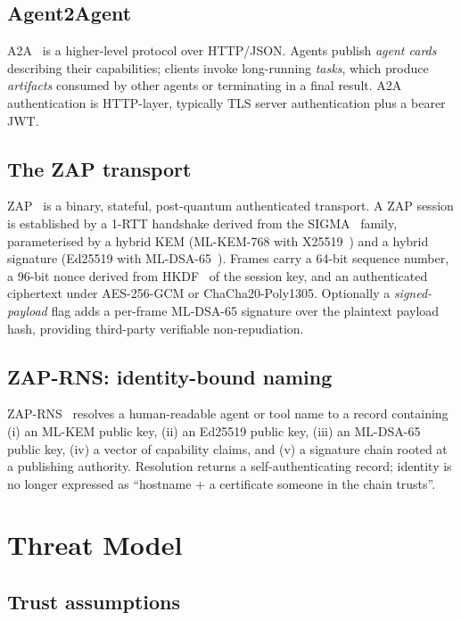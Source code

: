 \documentclass[11pt,a4paper]{article}
\theoremstyle{definition}
\theoremstyle{remark}
\newcommand{\zap}{\textsf{ZAP}\xspace}
\newcommand{\aatwo}{\textsf{A2A}\xspace}
\newcommand{\rns}{\textsf{ZAP-RNS}\xspace}
\begin{document}
\subsection{Agent2Agent}

\aatwo{}~\cite{a2a2025} is a higher-level protocol over HTTP/JSON.
Agents publish \emph{agent cards} describing their capabilities; clients
invoke long-running \emph{tasks}, which produce
\emph{artifacts} consumed by other agents or terminating in a final
result. \aatwo{} authentication is HTTP-layer, typically TLS server
authentication plus a bearer JWT.

\subsection{The \zap{} transport}

\zap{}~\cite{zaptransport} is a binary, stateful, post-quantum
authenticated transport. A \zap{} session is established by a 1-RTT
handshake derived from the SIGMA~\cite{sigma} family, parameterised by
a hybrid KEM (ML-KEM-768 with X25519~\cite{kyber2018,nistmlkem}) and a
hybrid signature (Ed25519 with ML-DSA-65~\cite{nistmldsa,ed25519}).
Frames carry a 64-bit sequence number, a 96-bit nonce derived from
HKDF~\cite{krawczyk2010hkdf} of the session key, and an authenticated
ciphertext under AES-256-GCM or ChaCha20-Poly1305. Optionally a
\emph{signed-payload} flag adds a per-frame ML-DSA-65 signature over
the plaintext payload hash, providing third-party verifiable
non-repudiation.

\subsection{\rns{}: identity-bound naming}

\rns{}~\cite{zaprns} resolves a human-readable agent or tool name to a
record containing (i) an ML-KEM public key, (ii) an Ed25519 public key,
(iii) an ML-DSA-65 public key, (iv) a vector of capability claims, and
(v) a signature chain rooted at a publishing authority. Resolution
returns a self-authenticating record; identity is no longer expressed
as ``hostname + a certificate someone in the chain trusts''.

\section{Threat Model}\label{sec:threat}

\subsection{Trust assumptions}
\end{document}

